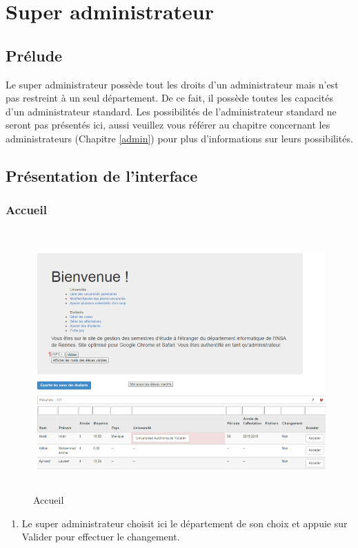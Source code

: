 \chapter{Super administrateur}

\section{Prélude}

Le super administrateur possède tout les droits d'un administrateur mais n'est pas restreint à un seul département. De ce fait, il possède toutes les capacités d'un administrateur standard. Les possibilités de l'administrateur standard ne seront pas présentés ici, aussi veuillez vous référer au chapitre concernant les administrateurs (Chapitre \ref{admin}) pour plus d'informations sur leurs possibilités. 

\section{Présentation de l'interface}

  \subsection{Accueil}
  \begin{figure}[H]
  	\centering
  	
  	\includegraphics[width=16cm,height=10cm]{Images/Super_Admin/menu_acceuil_super_admin}
  	\caption{Accueil}
  	\label{asa}
  \end{figure}
  
  \begin{enumerate}
  	\item Le super administrateur choisit ici le département de son choix et appuie sur Valider pour effectuer le changement.
  \end{enumerate}
  
